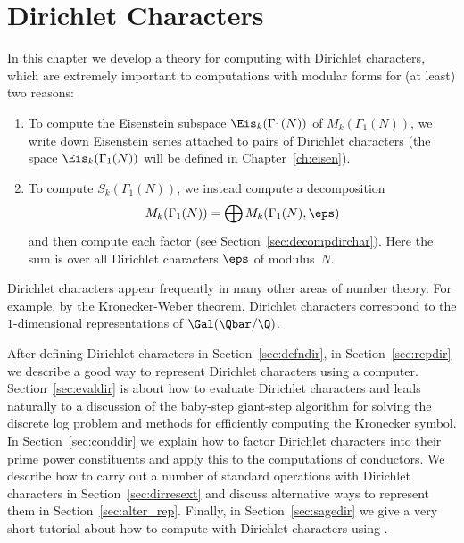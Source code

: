 




\chapter{Dirichlet Characters}\label{ch:dirichlet}

In this chapter we develop a theory for computing with Dirichlet
characters, which are extremely important to computations with modular
forms for (at least) two reasons:
\begin{enumerate}
\item To compute the Eisenstein subspace $\Eis_k(\Gamma_1(N))$
of $M_k(\Gamma_1(N))$, we write down 
Eisenstein series attached to 
pairs of Dirichlet characters (the space 
$\Eis_k(\Gamma_1(N))$ will be defined in Chapter~\ref{ch:eisen}).

\item To compute $S_k(\Gamma_1(N))$, we instead compute
a decomposition
$$
    M_k(\Gamma_1(N)) = \bigoplus M_k(\Gamma_1(N), \eps)
$$
and then compute each factor (see Section~\ref{sec:decompdirchar}).  
Here the sum is over all Dirichlet characters $\eps$ of modulus~$N$.
\end{enumerate}

Dirichlet characters appear frequently in many other areas of
number theory.  For example, by the Kronecker-Weber theorem, Dirichlet
characters correspond to the $1$-dimensional representations of
$\Gal(\Qbar/\Q)$.

After defining Dirichlet characters in Section~\ref{sec:defndir}, in
Section~\ref{sec:repdir} we describe a good way to represent Dirichlet
characters using a computer.  Section~\ref{sec:evaldir} is about how
to evaluate Dirichlet characters and leads naturally to a discussion
of the baby-step giant-step algorithm for solving the discrete log
problem and methods for efficiently computing the Kronecker symbol.
In Section~\ref{sec:conddir} we explain how to factor Dirichlet
characters into their prime power constituents and apply this to the
computations of conductors.   We describe how to carry out a number
of standard operations with Dirichlet characters in 
Section~\ref{sec:dirresext} and discuss alternative ways
to represent them in Section~\ref{sec:alter_rep}. 
Finally, in Section~\ref{sec:sagedir} we give a very 
short tutorial about how to compute with Dirichlet characters using \sage.




